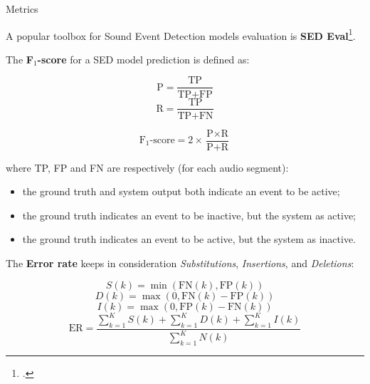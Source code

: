 	\begin{frame}[allowframebreaks]{Metrics}

		A popular toolbox for Sound Event Detection models evaluation is \textbf{SED Eval}\footcite{app6060162}.

		The \textbf{F$_{1}$-score} for a SED model prediction is defined as:\vspace{-3em}

		\begin{multicols}{2}
  			\begin{equation*}
    			\text{P} = \frac{\text{TP}}{\text{TP} + \text{FP}}
  			\end{equation*}\break
  			\begin{equation*}
    			\text{R} = \frac{\text{TP}}{\text{TP} + \text{FN}}
  			\end{equation*}
		\end{multicols}
		\vspace{-1em}
		\begin{equation*}
			\text{F$_{1}$-score} = 2 \times \frac{\text{P} \times \text{R}}{\text{P} + \text{R}}
		\end{equation*}

		where TP, FP and FN are respectively (for each audio segment):

		\begin{itemize}
			\item the ground truth and system output both indicate an event to be active;
			\item the ground truth indicates an event to be inactive, but the system as active;
			\item the ground truth indicates an event to be active, but the system as inactive.
		\end{itemize}

	\framebreak

		The \textbf{Error rate} keeps in consideration \textit{Substitutions}, \textit{Insertions},
		and \textit{Deletions}:\vspace{-1em}

		\begin{multicols}{2}		
  			\begin{equation*}
    			S(k)=\min(\text{FN}(k),\text{FP}(k))
  			\end{equation*}
  			\begin{equation*}
    			D(k)=\max(0,\text{FN}(k)-\text{FP}(k))
  			\end{equation*}
  			\begin{equation*}
    			I(k)=\max(0,\text{FP}(k)-\text{FN}(k))
  			\end{equation*}
			\break
  			\begin{equation*}
    			\text{ER}=\frac{\sum_{k=1}^{K}S(k)+\sum_{k=1}^{K}D(k)+\sum_{k=1}^{K}I(k)}{\sum_{k=1}^{K}N(k)}
  			\end{equation*}
		\end{multicols}


\end{frame}
